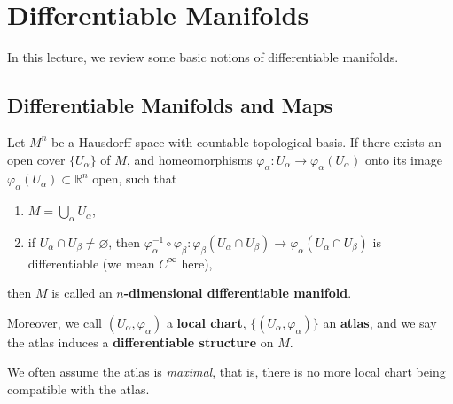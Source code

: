\chapter{Differentiable Manifolds}
In this lecture, we review some basic notions of differentiable manifolds.

\section{Differentiable Manifolds and Maps}

\begin{defn}
    Let $M^n$ be a Hausdorff space with countable topological basis.
    If there exists an open cover $\{U_\alpha\}$ of $M$, and homeomorphisms $\varphi_\alpha:U_\alpha\to\varphi_\alpha(U_\alpha)$ onto its image $\varphi_\alpha(U_\alpha)\subset\mathbb{R}^n$ open, such that
    \begin{enumerate}[(1)]
        \item $M=\bigcup_\alpha U_\alpha$,
        \item if $U_\alpha\cap U_\beta\neq\varnothing$, then $\varphi_\alpha^{-1}\circ\varphi_\beta:\varphi_\beta(U_\alpha\cap U_\beta)\to\varphi_\alpha(U_\alpha\cap U_\beta)$ is differentiable (we mean $C^\infty$ here),
    \end{enumerate}
    then $M$ is called an \textbf{$n$-dimensional differentiable manifold}.

    Moreover, we call $(U_\alpha,\varphi_\alpha)$ a \textbf{local chart}, $\{(U_\alpha,\varphi_\alpha)\}$ an \textbf{atlas}, and we say the atlas induces a \textbf{differentiable structure} on $M$.
\end{defn}

\begin{rem}
    We often assume the atlas is \emph{maximal}, that is, there is no more local chart being compatible with the atlas.
\end{rem}


